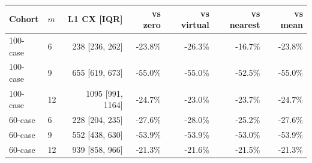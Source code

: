 \begin{tabular}{llrrrrr}
\toprule
Cohort & $m$ & L1 CX [IQR] & vs zero & vs virtual & vs nearest & vs mean\\
\midrule
100-case & 6 & 238 [236, 262] & -23.8\% & -26.3\% & -16.7\% & -23.8\%\\
100-case & 9 & 655 [619, 673] & -55.0\% & -55.0\% & -52.5\% & -55.0\%\\
100-case & 12 & 1095 [991, 1164] & -24.7\% & -23.0\% & -23.7\% & -24.7\%\\
60-case & 6 & 228 [204, 235] & -27.6\% & -28.0\% & -25.2\% & -27.6\%\\
60-case & 9 & 552 [438, 630] & -53.9\% & -53.9\% & -53.0\% & -53.9\%\\
60-case & 12 & 939 [858, 966] & -21.3\% & -21.6\% & -21.5\% & -21.3\%\\
\bottomrule
\end{tabular}
